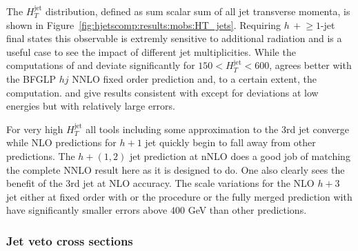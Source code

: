 
The $H_T^\text{jet}$ distribution, defined as sum scalar sum of all jet 
transverse momenta, is shown in Figure~\ref{fig:hjetscomp:results:mobs:HT_jets}. 
Requiring $h\,+\!\ge\!\!1$-jet final states this observable is
extremly sensitive to additional radiation and is a useful case to see 
the impact of different jet multiplicities. While the \NNLOPS 
computations of \Sherpa and \Powheg deviate significantly for 
$150 < H_T^\text{jet} < 600$, \Sherpa \NNLOPS agrees better with 
the BFGLP $hj$ NNLO fixed order prediction and, to a certain extent, 
the \Sherpa \MEPSatNLO computation. \Herwig and \MGaMC give results 
consistent with \Powheg except for deviations at low energies but with 
relatively large errors.

For very high $H_T^\text{jet}$ all tools including some approximation to the 3rd
jet converge while NLO predictions for $h+1$ jet quickly begin to fall away
from other predictions. The \Loopsim $h+(1,2)$ jet prediction at nNLO does a good
job of matching the complete NNLO result here as it is designed to do. One also
clearly sees the benefit of the 3rd jet at NLO accuracy.  The scale variations
for the NLO $h+3$ jet either at fixed order with \Loopsim or the \Minlo
procedure or the fully merged prediction with \Sherpa \MEPSatNLO have
significantly smaller errors above $400$ GeV than other predictions.



\clearpage
\subsubsection{Jet veto cross sections}
\label{sec:hjetscomp:results:jvobs}


